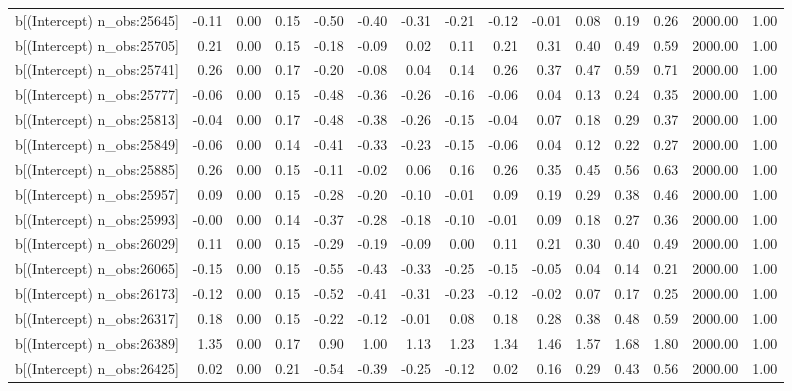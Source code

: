 \begin{table}[ht]
\begin{tabular}{rrrrrrrrrrrrrrr}
  b[(Intercept) n\_obs:25645] & -0.11 & 0.00 & 0.15 & -0.50 & -0.40 & -0.31 & -0.21 & -0.12 & -0.01 & 0.08 & 0.19 & 0.26 & 2000.00 & 1.00 \\ 
  b[(Intercept) n\_obs:25705] & 0.21 & 0.00 & 0.15 & -0.18 & -0.09 & 0.02 & 0.11 & 0.21 & 0.31 & 0.40 & 0.49 & 0.59 & 2000.00 & 1.00 \\ 
  b[(Intercept) n\_obs:25741] & 0.26 & 0.00 & 0.17 & -0.20 & -0.08 & 0.04 & 0.14 & 0.26 & 0.37 & 0.47 & 0.59 & 0.71 & 2000.00 & 1.00 \\ 
  b[(Intercept) n\_obs:25777] & -0.06 & 0.00 & 0.15 & -0.48 & -0.36 & -0.26 & -0.16 & -0.06 & 0.04 & 0.13 & 0.24 & 0.35 & 2000.00 & 1.00 \\ 
  b[(Intercept) n\_obs:25813] & -0.04 & 0.00 & 0.17 & -0.48 & -0.38 & -0.26 & -0.15 & -0.04 & 0.07 & 0.18 & 0.29 & 0.37 & 2000.00 & 1.00 \\ 
  b[(Intercept) n\_obs:25849] & -0.06 & 0.00 & 0.14 & -0.41 & -0.33 & -0.23 & -0.15 & -0.06 & 0.04 & 0.12 & 0.22 & 0.27 & 2000.00 & 1.00 \\ 
  b[(Intercept) n\_obs:25885] & 0.26 & 0.00 & 0.15 & -0.11 & -0.02 & 0.06 & 0.16 & 0.26 & 0.35 & 0.45 & 0.56 & 0.63 & 2000.00 & 1.00 \\ 
  b[(Intercept) n\_obs:25957] & 0.09 & 0.00 & 0.15 & -0.28 & -0.20 & -0.10 & -0.01 & 0.09 & 0.19 & 0.29 & 0.38 & 0.46 & 2000.00 & 1.00 \\ 
  b[(Intercept) n\_obs:25993] & -0.00 & 0.00 & 0.14 & -0.37 & -0.28 & -0.18 & -0.10 & -0.01 & 0.09 & 0.18 & 0.27 & 0.36 & 2000.00 & 1.00 \\ 
  b[(Intercept) n\_obs:26029] & 0.11 & 0.00 & 0.15 & -0.29 & -0.19 & -0.09 & 0.00 & 0.11 & 0.21 & 0.30 & 0.40 & 0.49 & 2000.00 & 1.00 \\ 
  b[(Intercept) n\_obs:26065] & -0.15 & 0.00 & 0.15 & -0.55 & -0.43 & -0.33 & -0.25 & -0.15 & -0.05 & 0.04 & 0.14 & 0.21 & 2000.00 & 1.00 \\ 
  b[(Intercept) n\_obs:26173] & -0.12 & 0.00 & 0.15 & -0.52 & -0.41 & -0.31 & -0.23 & -0.12 & -0.02 & 0.07 & 0.17 & 0.25 & 2000.00 & 1.00 \\ 
  b[(Intercept) n\_obs:26317] & 0.18 & 0.00 & 0.15 & -0.22 & -0.12 & -0.01 & 0.08 & 0.18 & 0.28 & 0.38 & 0.48 & 0.59 & 2000.00 & 1.00 \\ 
  b[(Intercept) n\_obs:26389] & 1.35 & 0.00 & 0.17 & 0.90 & 1.00 & 1.13 & 1.23 & 1.34 & 1.46 & 1.57 & 1.68 & 1.80 & 2000.00 & 1.00 \\ 
  b[(Intercept) n\_obs:26425] & 0.02 & 0.00 & 0.21 & -0.54 & -0.39 & -0.25 & -0.12 & 0.02 & 0.16 & 0.29 & 0.43 & 0.56 & 2000.00 & 1.00 \\ 

\end{tabular}
\end{table}
